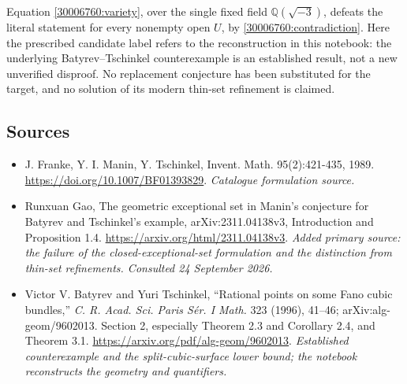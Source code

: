 \documentclass[11pt,a4paper]{article}
\newcommand{\Q}{\mathbb{Q}}
\numberwithin{equation}{section}
\begin{document}
Equation \eqref{30006760:variety}, over the single fixed field
$\Q(\sqrt{-3})$, defeats the literal statement for every nonempty open
$U$, by \eqref{30006760:contradiction}. Here the prescribed candidate label
refers to the reconstruction in this notebook: the underlying
Batyrev--Tschinkel counterexample is an established result, not a new
unverified disproof. No replacement conjecture has been substituted for
the target, and no solution of its modern thin-set refinement is claimed.

\subsection{Sources}
\begin{itemize}\raggedright
\item[\textnormal{[S1]}]\hypertarget{source:30006760:1}{} J. Franke, Y. I. Manin, Y. Tschinkel, Invent. Math. 95(2):421-435, 1989.
\url{https://doi.org/10.1007/BF01393829}.
{\small\textit{Catalogue formulation source.}}
\item[\textnormal{[E1]}]\hypertarget{extra:30006760:1}{} Runxuan Gao, The geometric exceptional set in Manin's conjecture for Batyrev and Tschinkel's example, arXiv:2311.04138v3, Introduction and Proposition 1.4.
\url{https://arxiv.org/html/2311.04138v3}.
{\small\textit{Added primary source: the failure of the closed-exceptional-set formulation and the distinction from thin-set refinements. Consulted 24 September 2026.}}
\item[\textnormal{[E2]}]\hypertarget{extra:30006760:2}{} Victor V. Batyrev and Yuri Tschinkel, ``Rational points on some Fano cubic bundles,'' \emph{C. R. Acad. Sci. Paris S\'er. I Math.} 323 (1996), 41--46; arXiv:alg-geom/9602013. Section 2, especially Theorem 2.3 and Corollary 2.4, and Theorem 3.1.
\url{https://arxiv.org/pdf/alg-geom/9602013}.
{\small\textit{Established counterexample and the split-cubic-surface lower bound; the notebook reconstructs the geometry and quantifiers.}}
\end{itemize}
\end{document}
